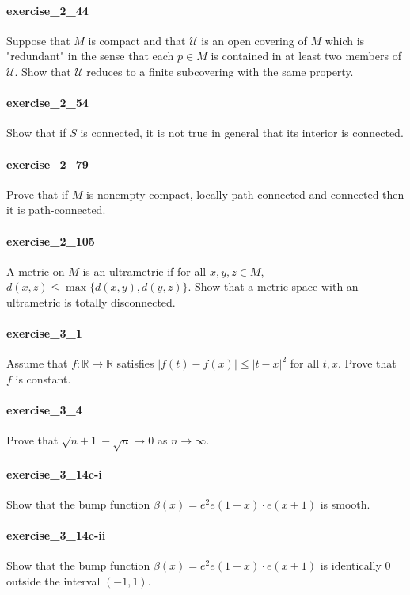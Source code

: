 \documentclass{article}
\begin{document}
\paragraph{exercise\_2\_44} Suppose that $M$ is compact and that $\mathcal{U}$ is an open covering of $M$ which is "redundant" in the sense that each $p \in M$ is contained in at least two members of $\mathcal{U}$. Show that $\mathcal{U}$ reduces to a finite subcovering with the same property.

\paragraph{exercise\_2\_54} Show that if $S$ is connected, it is not true in general that its interior is connected.

\paragraph{exercise\_2\_79} Prove that if $M$ is nonempty compact, locally path-connected and connected then it is path-connected.

\paragraph{exercise\_2\_105} A metric on $M$ is an ultrametric if for all $x, y, z \in M$, $d(x, z) \leq \max \{d(x, y), d(y, z)\} .$ Show that a metric space with an ultrametric is totally disconnected.

\paragraph{exercise\_3\_1} Assume that $f \colon \mathbb{R} \rightarrow \mathbb{R}$ satisfies $|f(t)-f(x)| \leq|t-x|^{2}$ for all $t, x$. Prove that $f$ is constant.

\paragraph{exercise\_3\_4} Prove that $\sqrt{n+1}-\sqrt{n} \rightarrow 0$ as $n \rightarrow \infty$.

\paragraph{exercise\_3\_14c-i} Show that the bump function $\beta(x)=e^{2} e(1-x) \cdot e(x+1)$ is smooth.

\paragraph{exercise\_3\_14c-ii} Show that the bump function $\beta(x)=e^{2} e(1-x) \cdot e(x+1)$ is identically 0 outside the interval $(-1, 1)$.
\end{document}
